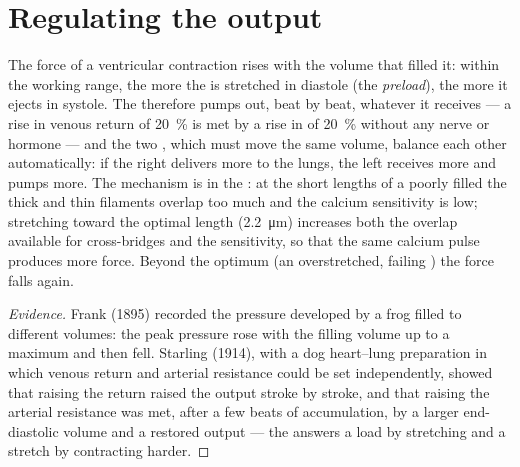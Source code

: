 \section{Regulating the output}

\begin{theorem}\label{thm:b2:heart:starling}
The force of a ventricular contraction rises with the volume that
filled it: within the working range, the more the  is
stretched in diastole (the \emph{preload}), the more it ejects in
systole. The  therefore pumps out, beat by beat, whatever it
receives --- a rise in venous return of \qty{20}{\%} is met by a rise
in  of \qty{20}{\%} without any nerve or hormone --- and
the two , which must move the same volume, balance each
other automatically: if the right  delivers more  to the
lungs, the left  receives more and pumps more. The mechanism is
in the : at the short lengths of a poorly filled
 the thick and thin filaments overlap too much and the
calcium sensitivity is low; stretching toward the optimal length
(\qty{2.2}{\micro m}) increases both the overlap available for
cross-bridges and the sensitivity, so that the same calcium pulse
produces more force. Beyond the optimum (an overstretched, failing
) the force falls again.
\end{theorem}
\begin{proof}[Evidence]
Frank (1895) recorded the pressure developed by a frog 
filled to different volumes: the peak pressure rose with the
filling volume up to a maximum and then fell. Starling (1914), with
a dog heart--lung preparation in which venous return and arterial
resistance could be set independently, showed that raising the
return raised the output stroke by stroke, and that raising the
arterial resistance was met, after a few beats of accumulation, by
a larger end-diastolic volume and a restored output --- the 
answers a load by stretching and a stretch by contracting harder.
\end{proof}

